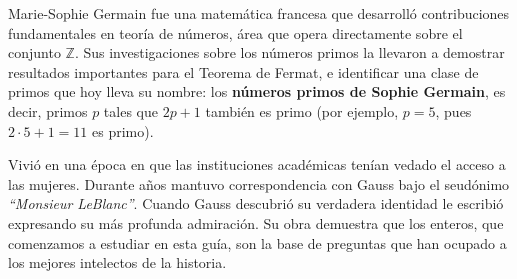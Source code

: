 \documentclass[11pt, letterpaper]{article}
\begin{document}
\begin{tcolorbox}[enhanced, breakable,
  colback=white, colframe=blockb, colbacktitle=blockb,
  coltitle=white, arc=4pt, leftrule=5pt,
  left=10pt, right=10pt, top=12pt, bottom=10pt,
  fonttitle=\bfseries,
  attach boxed title to top left={xshift=0.5cm, yshift*=-\tcboxedtitleheight/2},
  boxed title style={colframe=blockb, colback=blockb, arc=2pt},
  title={Sophie Germain \hfill \normalfont\itshape 1776--1831}]

\begin{minipage}[t]{0.18\linewidth}
\vspace{0pt}
\end{minipage}
\hfill
\begin{minipage}[t]{0.78\linewidth}
\vspace{0pt}
Marie-Sophie Germain fue una matem\'atica francesa que desarroll\'o contribuciones fundamentales en teor\'ia de n\'umeros, \'area que opera directamente sobre el conjunto $\mathbb{Z}$. Sus investigaciones sobre los n\'umeros primos la llevaron a demostrar resultados importantes para el Teorema de Fermat, e identificar una clase de primos que hoy lleva su nombre: los \textbf{n\'umeros primos de Sophie Germain}, es decir, primos $p$ tales que $2p+1$ tambi\'en es primo (por ejemplo, $p=5$, pues $2\cdot 5+1=11$ es primo).

\medskip
Vivi\'o en una \'epoca en que las instituciones acad\'emicas ten\'ian vedado el acceso a las mujeres. Durante a\~nos mantuvo correspondencia con Gauss bajo el seud\'onimo \textit{``Monsieur LeBlanc''}. Cuando Gauss descubri\'o su verdadera identidad le escribi\'o expresando su m\'as profunda admiraci\'on. Su obra demuestra que los enteros, que comenzamos a estudiar en esta gu\'ia, son la base de preguntas que han ocupado a los mejores intelectos de la historia.
\end{minipage}
\end{tcolorbox}
\end{document}
